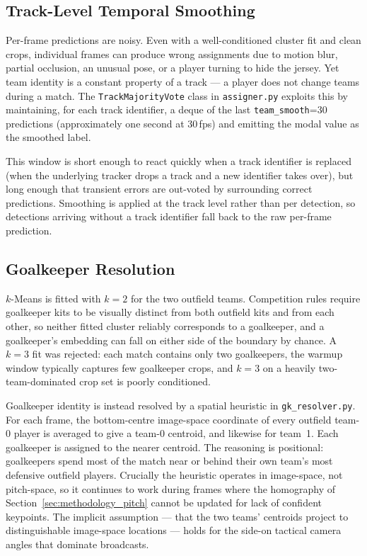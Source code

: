 \subsection{Track-Level Temporal Smoothing}
\label{subsec:methodology_team_smoothing}

Per-frame predictions are noisy. Even with a well-conditioned cluster fit
and clean crops, individual frames can produce wrong assignments due to
motion blur, partial occlusion, an unusual pose, or a player turning to
hide the jersey. Yet team identity is a constant property of a track --- a
player does not change teams during a match. The
\texttt{TrackMajorityVote} class in \texttt{assigner.py} exploits this by
maintaining, for each track identifier, a deque of the last
\texttt{team\_smooth}=30 predictions (approximately one second at 30\,fps)
and emitting the modal value as the smoothed label.

This window is short enough to react quickly when a track identifier is
replaced (when the underlying tracker drops a track and a new identifier
takes over), but long enough that transient errors are out-voted by
surrounding correct predictions. Smoothing is applied at the track level
rather than per detection, so detections arriving without a track identifier
fall back to the raw per-frame prediction.

\subsection{Goalkeeper Resolution}
\label{subsec:methodology_gk_resolver}

$k$-Means is fitted with $k=2$ for the two outfield teams. Competition rules
require goalkeeper kits to be visually distinct from both outfield kits and
from each other, so neither fitted cluster reliably corresponds to a
goalkeeper, and a goalkeeper's embedding can fall on either side of the
boundary by chance. A $k=3$ fit was rejected: each match contains only two
goalkeepers, the warmup window typically captures few goalkeeper crops, and
$k=3$ on a heavily two-team-dominated crop set is poorly conditioned.

Goalkeeper identity is instead resolved by a spatial heuristic in
\texttt{gk\_resolver.py}. For each frame, the bottom-centre image-space
coordinate of every outfield team-0 player is averaged to give a team-0
centroid, and likewise for team~1. Each goalkeeper is assigned to the
nearer centroid. The reasoning is positional: goalkeepers spend most of the
match near or behind their own team's most defensive outfield players.
Crucially the heuristic operates in image-space, not pitch-space, so it
continues to work during frames where the homography of
Section~\ref{sec:methodology_pitch} cannot be updated for lack of confident
keypoints. The implicit assumption --- that the two teams' centroids
project to distinguishable image-space locations --- holds for the side-on
tactical camera angles that dominate broadcasts.

